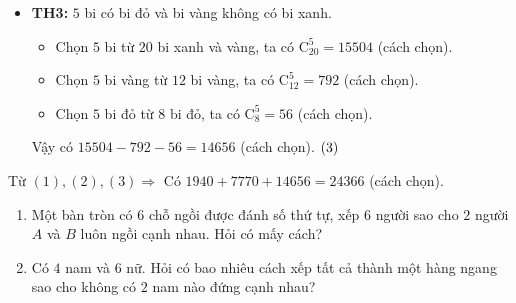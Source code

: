 \begin{bt}
{\begin{enumerate}
\begin{itemize}
	\item \textbf{TH3:} $5$ bi có bi đỏ và bi vàng không có bi xanh.
	\begin{itemize}
	\item Chọn $5$ bi từ $20$ bi xanh và vàng, ta có $\mathrm{C}_{20}^5=15504$ (cách chọn).
	\item Chọn $5$ bi vàng từ $12$ bi vàng, ta có $\mathrm{C}_{12}^5=792$ (cách chọn).
	\item Chọn $5$ bi đỏ từ $8$ bi đỏ, ta có $\mathrm{C}_8^5=56$ (cách chọn).
	\end{itemize}
	Vậy có $15504-792-56=14656$ (cách chọn). $\hfill (3)$
	\end{itemize}
	Từ $(1), (2), (3) \Rightarrow $ Có $1940+7770+14656=24366$ (cách chọn).
	\end{enumerate}}
\end{bt}

\begin{bt}%
	\begin{enumerate}
	\item	Một bàn tròn có $6$ chỗ ngồi được đánh số thứ tự, xếp $6$ người sao cho $2$ người $A$ và $B$ luôn ngồi cạnh nhau. Hỏi có mấy cách?
	\item Có $4$ nam và $6$ nữ. Hỏi có bao nhiêu cách xếp tất cả thành một hàng ngang sao cho không có $2$ nam nào đứng cạnh nhau?
	\end{enumerate}
\end{bt}

